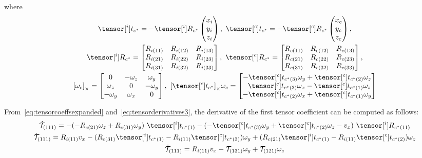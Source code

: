 where
\begin{gather*}
\tensor[^{i}]{t}{_{c^*}} = -\tensor[^{i}]{R}{_{c^*}}\begin{pmatrix} x_i \\ y_i \\ z_i \end{pmatrix}, \
\tensor[^{c}]{t}{_{c^*}} = -\tensor[^{c}]{R}{_{c^*}}\begin{pmatrix} x_c \\ y_c \\ z_c \end{pmatrix}, \\
  \tensor[^{i}]{R}{_{c^*}} = \begin{bmatrix}
    R_{i(11)} & R_{i(12)} & R_{i(13)} \\
    R_{i(21)} & R_{i(22)} & R_{i(23)} \\
    R_{i(31)} & R_{i(32)} & R_{i(33)}
  \end{bmatrix},\
\tensor[^{c}]{R}{_{c^*}} = \begin{bmatrix}
  R_{c(11)} & R_{c(12)} & R_{c(13)} \\
  R_{c(21)} & R_{c(22)} & R_{c(23)} \\
  R_{c(31)} & R_{c(32)} & R_{c(33)}
\end{bmatrix},\\
{[\omega_{c}]}_{\times} = \begin{bmatrix} 0 & -\omega_z & \omega_y \\ \omega_z & 0 & -\omega_y \\ -\omega_y & \omega_x & 0 \end{bmatrix},\
{[\tensor[^{c}]{t}{_{c^*}}]}_{\times}\omega_c  = \begin{bmatrix} -\tensor[^{c}]{t}{_{c^*(3)}}\omega_y + \tensor[^{c}]{t}{_{c^*(2)}} \omega_z \\\ \ \tensor[^{c}]{t}{_{c^*(3)}}\omega_x - \tensor[^{c}]{t}{_{c^*(1)}} \omega_z \\ -\tensor[^{c}]{t}{_{c^*(2)}}\omega_x + \tensor[^{c}]{t}{_{c^*(1)}}\omega_y \end{bmatrix}
\end{gather*}

From~\eqref{eq:tensorcoeffsexpanded} and~\eqref{eq:tensorderivatives3}, the derivative of the first tensor coefficient can be computed as follows:
\begin{equation}
\begin{gathered}
  \dot{\mathcal{T}}_{(111)} =  - (-R_{c(21)} \omega_z + R_{c(31)}\omega_y)\ \tensor[^{i}]{t}{_{c^*(1)}} - (-\tensor[^{c}]{t}{_{c^*(3)}}\omega_y + \tensor[^{c}]{t}{_{c^*(2)}} \omega_z - v_x)\ \tensor[^{i}]{R}{_{c^*(11)}}\\
  \dot{\mathcal{T}}_{(111)} = R_{i(11)}v_x - (R_{c(31)}\tensor[^{i}]{t}{_{c^*(1)}} - R_{i(11)}\tensor[^{c}]{t}{_{c^*(3)}}) \omega_y  + (R_{c(21)}\tensor[^{i}]{t}{_{c^*(1)}} - R_{i(11)}\tensor[^{c}]{t}{_{c^*(2)}} ) \omega_z\\
  \dot{\mathcal{T}}_{(111)} = R_{i(11)}v_x - \mathcal{T}_{(131)} \omega_y  +  \mathcal{T}_{(121)} \omega_z
\end{gathered}
\end{equation}

